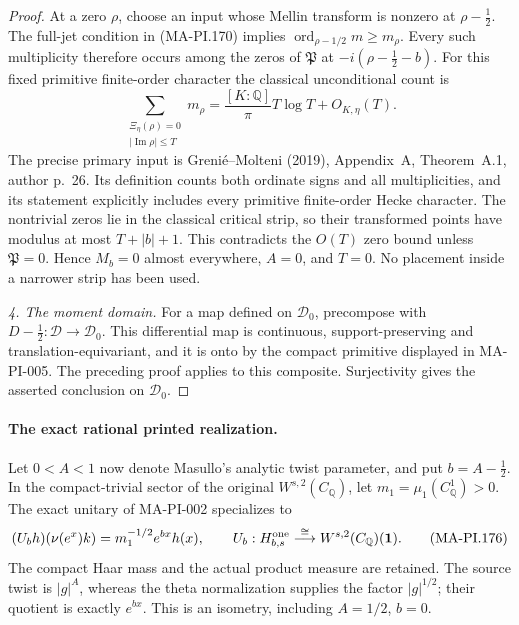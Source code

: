 \begin{proof}
At a zero \(\rho\), choose an input whose Mellin
transform is nonzero at \(\rho-\tfrac12\).
The full-jet condition in (MA-PI.170) implies
\(\operatorname{ord}_{\rho-1/2}m\ge m_\rho\).
Every such multiplicity therefore occurs among the
zeros of \(\mathfrak P\) at
\(-i(\rho-\tfrac12-b)\).
For this fixed primitive finite-order character the
classical unconditional count is
\[
 \sum_{\substack{\Xi_\eta(\rho)=0\\|\operatorname{Im}\rho|\le T}}
       m_\rho
      =\frac{[K:\mathbb Q]}{\pi}T\log T+O_{K,\eta}(T).
 \tag{MA-PI.175}
\]
The precise primary input is Greni\'e--Molteni (2019),
Appendix~A, Theorem~A.1, author p.~26.
Its definition counts both ordinate signs and all
multiplicities, and its statement explicitly includes
every primitive finite-order Hecke character.
The nontrivial zeros lie in the classical critical strip,
so their transformed points have modulus at most
\(T+|b|+1\).  This contradicts the \(O(T)\) zero bound
unless \(\mathfrak P=0\).  Hence \(M_b=0\) almost
everywhere, \(A=0\), and \(T=0\).
No placement inside a narrower strip has been used.

\emph{4. The moment domain.}
For a map defined on \(\mathcal D_0\), precompose with
\(D-\tfrac12:\mathcal D\to\mathcal D_0\).
This differential map is continuous, support-preserving
and translation-equivariant, and it is onto by the
compact primitive displayed in MA-PI-005.
The preceding proof applies to this composite.
Surjectivity gives the asserted conclusion on
\(\mathcal D_0\).
\end{proof}

\paragraph{The exact rational printed realization.}
Let \(0<A<1\) now denote Masullo's analytic twist parameter,
and put \(b=A-\tfrac12\).
In the compact-trivial sector of the original
\(W^{s,2}(C_{\mathbb Q})\), let
\(m_1=\mu_1(C_{\mathbb Q}^1)>0\).
The exact unitary of MA-PI-002 specializes to
\[
 (U_bh)(\nu(e^x)k)
      =m_1^{-1/2}e^{bx}h(x),\qquad
 U_b:H^{\rm one}_{b,s}
       \overset{\cong}{\longrightarrow}
             W^{s,2}(C_{\mathbb Q})(\mathbf1).
 \tag{MA-PI.176}
\]
The compact Haar mass and the actual product measure
are retained.  The source twist is \(|g|^A\), whereas
the theta normalization supplies the factor
\(|g|^{1/2}\); their quotient is exactly \(e^{bx}\).
This is an isometry, including \(A=1/2\), \(b=0\).

